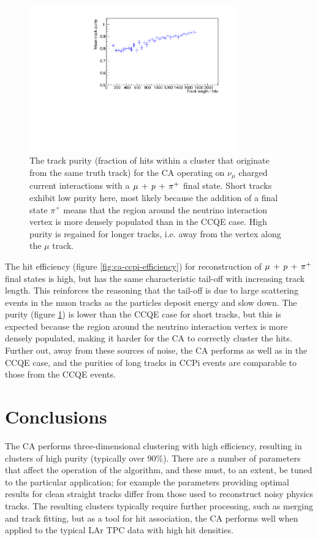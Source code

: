 \begin{figure}
    \centering
    \includegraphics[angle=-90,width=0.8\textwidth]{chapters/cellularautomaton_images/ccpi-purity}
    \caption[Track purity for \acs{CCPi} events reconstructed with a CA]{\label{fig:ca-ccpi-purity}The track purity (fraction of hits within a cluster that originate from the same truth track) for the CA operating on $\nu_\mu$ charged current interactions with a $\mu\,+\,p\,+\,\pi^{+}$ final state. Short tracks exhibit low purity here, most likely because the addition of a final state $\pi^+$ means that the region around the neutrino interaction vertex is more densely populated than in the CCQE case. High purity is regained for longer tracks, i.e. away from the vertex along the $\mu$ track.}
\end{figure}

The hit efficiency (figure \ref{fig:ca-ccpi-efficiency}) for reconstruction of $\mu\,+\,p\,+\,\pi^{+}$ final states is high, but has the same characteristic tail-off with increasing track length. This reinforces the reasoning that the tail-off is due to large scattering events in the muon tracks as the particles deposit energy and slow down. The purity (figure \ref{fig:ca-ccpi-purity}) is lower than the CCQE case for short tracks, but this is expected because the region around the neutrino interaction vertex is more densely populated, making it harder for the CA to correctly cluster the hits. Further out, away from these sources of noise, the CA performs as well as in the CCQE case, and the purities of long tracks in \acs{CCPi} events are comparable to those from the CCQE events.

\section{Conclusions}
The \ac{CA} performs three-dimensional clustering with high efficiency, resulting in clusters of high purity (typically over $90\%$). There are a number of parameters that affect the operation of the algorithm, and these must, to an extent, be tuned to the particular application; for example the parameters providing optimal results for clean straight tracks differ from those used to reconstruct noisy physics tracks. The resulting clusters typically require further processing, such as merging and track fitting, but as a tool for hit association, the CA performs well when applied to the typical \ac{LAr TPC} data with high hit densities.

